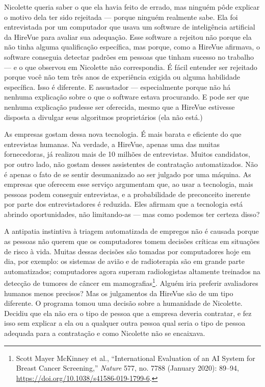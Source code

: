 Nicolette queria saber o que ela havia feito de errado, mas ninguém pôde
explicar o motivo dela ter sido rejeitada --- porque ninguém realmente sabe.
Ela foi entrevistada por um computador que usava um software de inteligência
artificial da HireVue para avaliar sua adequação. Esse software a rejeitou não
porque ela não tinha alguma qualificação específica, mas porque, como a HireVue
afirmava, o software conseguia detectar padrões em pessoas que tinham sucesso no
trabalho --- e o que observou em Nicolette não correspondia. É fácil entender
ser rejeitado porque você não tem três anos de experiência exigida ou alguma
habilidade específica. Isso é diferente. E assustador --- especialmente porque
não há nenhuma explicação sobre o que o software estava procurando. E pode ser
que nenhuma explicação pudesse ser oferecida, mesmo que a HireVue estivesse
disposta a divulgar seus algoritmos proprietários (ela não está.)

As empresas gostam dessa nova tecnologia. É mais barata e eficiente do que 
entrevistas humanas. Na verdade, a HireVue, apenas uma das muitas fornecedoras, 
já realizou mais de 10 milhões de entrevistas. Muitos candidatos, por outro 
lado, não gostam desses assistentes de contratação automatizados. Não é apenas o 
fato de se sentir desumanizado ao ser julgado por uma máquina. As empresas que 
oferecem esse serviço argumentam que, ao usar a tecnologia, mais pessoas podem 
conseguir entrevistas, e a probabilidade de preconceito inerente por parte dos
entrevistadores é reduzida. Eles afirmam que a tecnologia está abrindo
oportunidades, não limitando-as --- mas como podemos ter certeza disso?

A antipatia instintiva à triagem automatizada de empregos não é causada porque
as pessoas não querem que os computadores tomem decisões críticas em situações
de risco à vida. Muitas dessas decisões são tomadas por computadores hoje em
dia, por exemplo: os sistemas de avião e de radioterapia são em grande parte 
automatizados; computadores agora superam radiologistas altamente treinados na 
detecção de tumores de câncer em mamografias\footnote{Scott Mayer McKinney et
al., ``International Evaluation of an AI System for Breast Cancer Screening,''
\textit{Nature} 577, no. 7788 (January 2020): 89--94,
\url{https://doi.org/10.1038/s41586-019-1799-6}.}. Alguém iria preferir
avaliadores humanos menos precisos? Mas os julgamentos da HireVue são de um tipo
diferente. O programa tomou uma decisão sobre a humanidade de Nicolette. Decidiu
que ela não era o tipo de pessoa que a empresa deveria contratar, e fez isso sem
explicar a ela ou a qualquer outra pessoa qual seria o tipo de pessoa adequada
para a contratação e como Nicolette não se encaixava.

